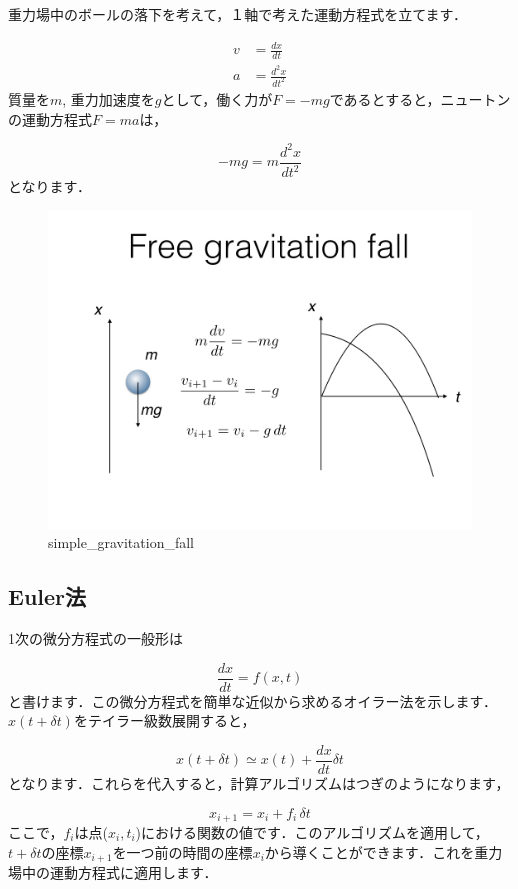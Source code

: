 \documentclass[11pt,dvipdfmx]{jsarticle}
\makeatletter
\def\maxwidth{\ifdim\Gin@nat@width>\linewidth\linewidth
    \else\Gin@nat@width\fi}
\let\Oldincludegraphics\includegraphics
\renewcommand{\includegraphics}[1]{\Oldincludegraphics[width=.8\maxwidth]{#1}}
\makeatother
\begin{document}
重力場中のボールの落下を考えて，１軸で考えた運動方程式を立てます．

\[
\begin{aligned}
v &= \frac{dx}{dt} \\
a &= \frac{d^2 x}{dt^2}
\end{aligned}
\] 質量を\(m\),
重力加速度を\(g\)として，働く力が\(F=-mg\)であるとすると，ニュートンの運動方程式\(F=ma\)は，

\[ 
-mg = m \frac{d^2 x}{dt^2}
\] となります．

\begin{figure}[htbp]
\centering
\includegraphics{../figs/ode.002.jpeg}
\caption{simple\_gravitation\_fall}
\end{figure}

    \subsection{Euler法}\label{eulerux6cd5}

1次の微分方程式の一般形は

\[
\frac{dx}{dt}=f(x,t)
\]
と書けます．この微分方程式を簡単な近似から求めるオイラー法を示します．
\(x(t+\delta t)\)をテイラー級数展開すると，

\[
x(t+\delta t) \simeq x(t) + \frac{dx}{dt} \delta t
\]
となります．これらを代入すると，計算アルゴリズムはつぎのようになります，

\[
x_{i+1} = x_i + f_i\,\delta t
\]
ここで，\(f_i\)は点(\(x_i, t_i\))における関数の値です．このアルゴリズムを適用して，\(t+\delta t\)の座標\(x_{i+1}\)を一つ前の時間の座標\(x_i\)から導くことができます．これを重力場中の運動方程式に適用します．
\end{document}
